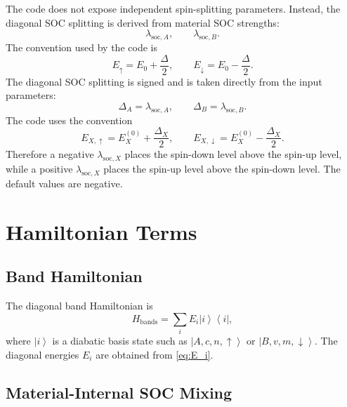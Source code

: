 \documentclass[11pt,a4paper]{article}
\newcommand{\ket}[1]{\left|#1\right\rangle}
\newcommand{\bra}[1]{\left\langle #1\right|}
\begin{document}
The code does not expose independent spin-splitting parameters.  Instead, the diagonal SOC splitting is derived from material SOC strengths:
\begin{equation}
\lambda_{\mathrm{soc},A},
\qquad
\lambda_{\mathrm{soc},B}.
\end{equation}
The convention used by the code is
\begin{equation}
E_{\uparrow}=E_0+\frac{\Delta}{2},
\qquad
E_{\downarrow}=E_0-\frac{\Delta}{2}.
\end{equation}
The diagonal SOC splitting is signed and is taken directly from the input parameters:
\begin{equation}
\Delta_A = \lambda_{\mathrm{soc},A},
\qquad
\Delta_B = \lambda_{\mathrm{soc},B}.
\end{equation}
The code uses the convention
\begin{equation}
E_{X,\uparrow}=E^{(0)}_X+\frac{\Delta_X}{2},
\qquad
E_{X,\downarrow}=E^{(0)}_X-\frac{\Delta_X}{2}.
\label{eq:E_i}
\end{equation}
Therefore a negative \(\lambda_{\mathrm{soc},X}\) places the spin-down level above the spin-up level, while a positive \(\lambda_{\mathrm{soc},X}\) places the spin-up level above the spin-down level.  The default values are negative.

\section{Hamiltonian Terms}

\subsection{Band Hamiltonian}

The diagonal band Hamiltonian is
\begin{equation}
H_{\mathrm{bands}} = \sum_i E_i \ket{i}\bra{i},
\end{equation}
where $\ket{i}$ is a diabatic basis state such as $\ket{A,c,n,\uparrow}$ or $\ket{B,v,m,\downarrow}$.  
The diagonal energies $E_i$ are obtained from \eqref{eq:E_i}. 

\subsection{Material-Internal SOC Mixing}
\end{document}
